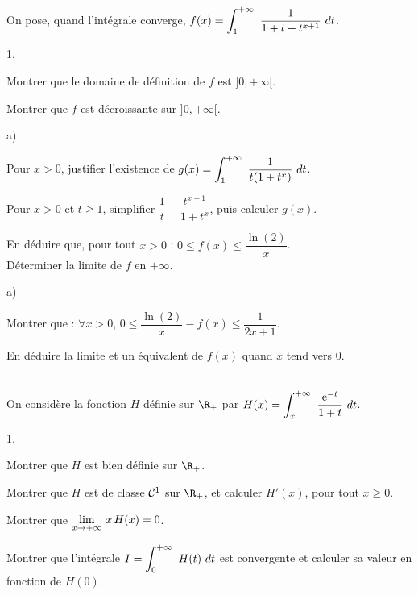 \documentclass[11pt]{article}%
\begin{document}
\begin{exercice}~\\
On pose, quand l'intégrale converge, $ f(x)=\displaystyle \int_{1}^{+\infty}\  
\dfrac{1}{1+t+t^{x+1}}\ dt$.
\begin{noliste}{1.}
  \item Montrer que le domaine de définition de $f$ est $]0,+\infty[$.
  \item Montrer que $f$ est décroissante sur $]0,+\infty[$.
  \item 
  \begin{noliste}{a)}
    \item Pour $x>0$, justifier l'existence de $ g(x)=\displaystyle \int_{1}^{+\infty}\  
    \dfrac{1}{t(1+t^x)}\ dt$.
    \item Pour $x>0$ et $t\geq 1$, simplifier 
    $\dfrac{1}{t}-\dfrac{t^{x-1}}{1+t^x}$, puis calculer $g(x)$.
    \item En déduire que, pour tout $x>0$ : $0\leq f(x) \leq \dfrac{\ln 
    (2)}{x}$.\\
    Déterminer la limite de $f$ en $+\infty$.
  \end{noliste}
  \item 
  \begin{noliste}{a)}
    \item Montrer que : $\forall x>0$, $0\leq \dfrac{\ln 
    (2)}{x}-f(x)\leq \dfrac{1}{2x+1}$.
    \item En déduire la limite et un équivalent de $f(x)$ quand $x$ 
    tend vers $0$.
  \end{noliste}
\end{noliste}
\end{exercice}



\begin{exercice}~\\
On considère la fonction $H$ définie sur $\R_+$ par $ 
H(x)=\displaystyle \int_{x}^{+\infty}\  \dfrac{\text{e}^{-t}}{1+t} \ dt$.
\begin{noliste}{1.}
  \item Montrer que $H$ est bien définie sur $\R_+$.
  \item Montrer que $H$ est de classe $\mathcal{C}^{1}$ sur $\R_+$, et 
  calculer $H'(x)$, pour tout $x\geq 0$.
  \item Montrer que $ {\displaystyle \lim_{x\to +\infty} \ } x \, H(x)=0$.
  \item Montrer que l'intégrale $ I=\displaystyle \int_{0}^{+\infty}\  H(t)\ dt$ est 
  convergente et calculer sa valeur en fonction de $H(0)$.
\end{noliste}
\end{exercice}
\end{document}
